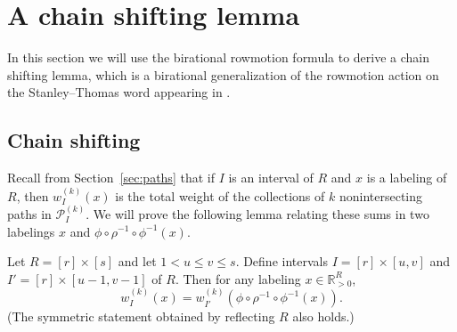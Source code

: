 \documentclass[ALCO,Unicode,published]{cedram}
\numberwithin{equation}{section}
\begin{document}

\section{A chain shifting lemma} \label{section:chainshifting}

In this section we will use the birational rowmotion formula to derive a chain shifting lemma, which is a birational generalization of the rowmotion action on the Stanley--Thomas word appearing in \cite{josephroby1}. %

\subsection{Chain shifting}

Recall from Section~\ref{sec:paths} that if $I$ is an interval of $R$ and $x$ is a labeling of $R$, then $w_I^{(k)}(x)$ is the total weight of the collections of $k$ nonintersecting paths in $\mathcal P_I^{(k)}$. We will prove the following lemma relating these sums in two labelings $x$ and $\phi \circ \rho^{-1} \circ \phi^{-1}(x)$.


\begin{Lemma} \label{chainshift}
Let $R = [r] \times [s]$ and let $1 < u \leq v \leq s$. Define intervals $I = [r] \times [u,v]$ and $I' = [r] \times [u-1,v-1]$ of $R$. Then for any labeling $x \in \mathbb R^{R}_{>0}$, \[w_{I}^{(k)}(x) = w_{I'}^{(k)}(\phi \circ \rho^{-1} \circ \phi^{-1}(x)).\]
(The symmetric statement obtained by reflecting $R$ also holds.)
%
%
\end{Lemma}

\end{document}
